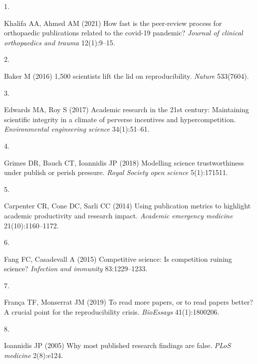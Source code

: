 \documentclass[9pt,twocolumn,twoside,]{pnas-new}
\newlength{\cslhangindent}
\newlength{\csllabelwidth}
\newlength{\cslentryspacingunit} %
\newenvironment{CSLReferences}[2] %
 {%
  \setlength{\parindent}{0pt}
  \ifodd #1
  \let\oldpar\par
  \def\par{\hangindent=\cslhangindent\oldpar}
  \fi
  \setlength{\parskip}{#2\cslentryspacingunit}
 }%
 {}
\newcommand{\CSLLeftMargin}[1]{\parbox[t]{\csllabelwidth}{#1}}
\newcommand{\CSLRightInline}[1]{\parbox[t]{\linewidth - \csllabelwidth}{#1}\break}
\begin{document}
\hypertarget{refs}{}
\begin{CSLReferences}{0}{0}
\leavevmode{}%
\CSLLeftMargin{1. }
\CSLRightInline{Khalifa AA, Ahmed AM (2021) How fast is the peer-review
process for orthopaedic publications related to the covid-19 pandemic?
\emph{Journal of clinical orthopaedics and trauma} 12(1):9--15.}

\leavevmode{}%
\CSLLeftMargin{2. }
\CSLRightInline{Baker M (2016) 1,500 scientists lift the lid on
reproducibility. \emph{Nature} 533(7604).}

\leavevmode{}%
\CSLLeftMargin{3. }
\CSLRightInline{Edwards MA, Roy S (2017) Academic research in the 21st
century: Maintaining scientific integrity in a climate of perverse
incentives and hypercompetition. \emph{Environmental engineering
science} 34(1):51--61.}

\leavevmode{}%
\CSLLeftMargin{4. }
\CSLRightInline{Grimes DR, Bauch CT, Ioannidis JP (2018) Modelling
science trustworthiness under publish or perish pressure. \emph{Royal
Society open science} 5(1):171511.}

\leavevmode{}%
\CSLLeftMargin{5. }
\CSLRightInline{Carpenter CR, Cone DC, Sarli CC (2014) Using publication
metrics to highlight academic productivity and research impact.
\emph{Academic emergency medicine} 21(10):1160--1172.}

\leavevmode{}%
\CSLLeftMargin{6. }
\CSLRightInline{Fang FC, Casadevall A (2015) Competitive science: Is
competition ruining science? \emph{Infection and immunity}
83:1229--1233.}

\leavevmode{}%
\CSLLeftMargin{7. }
\CSLRightInline{França TF, Monserrat JM (2019) To read more papers, or
to read papers better? A crucial point for the reproducibility crisis.
\emph{BioEssays} 41(1):1800206.}

\leavevmode{}%
\CSLLeftMargin{8. }
\CSLRightInline{Ioannidis JP (2005) Why most published research findings
are false. \emph{PLoS medicine} 2(8):e124.}

\end{CSLReferences}



% 
\end{document}
